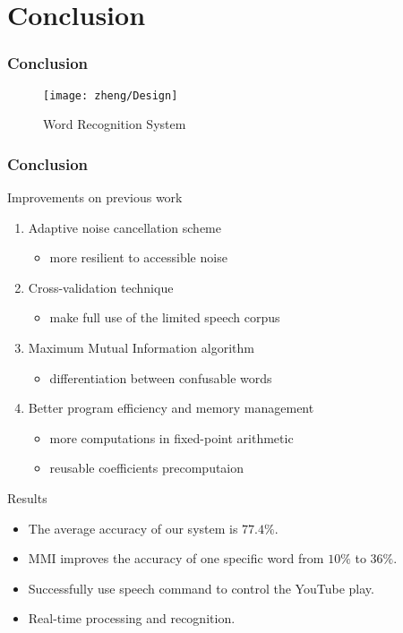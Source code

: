 \section{Conclusion}

\begin{frame}
\frametitle{Conclusion}
\begin{figure}[H]
\begin{center}
\texttt{[image: zheng/Design]} 
\vspace{-20pt}
\caption{Word Recognition System}
\label{fig 20}
\end{center}
\end{figure}
\end{frame}

\begin{frame}
\frametitle{Conclusion}
Improvements on previous work
\begin{enumerate}
	\item Adaptive noise cancellation scheme
	\begin{itemize}
		\item more resilient to accessible noise
	\end{itemize}
	\item Cross-validation technique
	\begin{itemize}
		\item make full use of the limited speech corpus
	\end{itemize}
	\item Maximum Mutual Information algorithm
	\begin{itemize}
		\item differentiation between confusable words
	\end{itemize}
	\item Better program efficiency and memory management
	\begin{itemize}
		\item more computations in fixed-point arithmetic
		\item reusable coefficients precomputaion
	\end{itemize}
\end{enumerate}
\end{frame}

\begin{frame}
\begin{block}{Results}
\begin{itemize}
	\item The average accuracy of our system is $77.4\%$.
	\item MMI improves the accuracy of one specific word from $10\%$ to $36\%$.
	\item Successfully use speech command to control the YouTube play.
	\item Real-time processing and recognition.
\end{itemize}
\end{block}
\end{frame}

